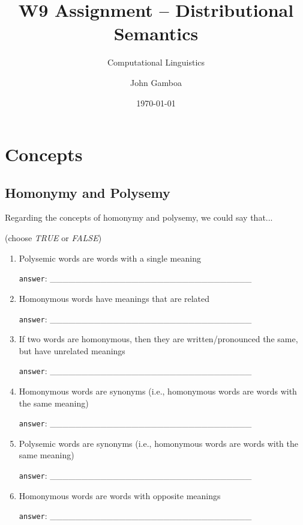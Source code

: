 \documentclass[a4paper,11pt]{scrartcl}
\title{W9 Assignment -- Distributional Semantics}
\subtitle{Computational Linguistics}
\author{John Gamboa}
\date{\today}
\begin{document}
\maketitle


\section{Concepts}

\subsection{Homonymy and Polysemy}

Regarding the concepts of homonymy and polysemy, we could say that...

(choose \textit{TRUE} or \textit{FALSE})

\begin{enumerate}[label=\alph*)]
\singlespacing%

\item Polysemic words are words with a single meaning

\verb|answer|: \_\_\_\_\_\_\_\_\_\_\_\_\_\_\_\_\_\_\_\_\_\_\_\_\_\_\_\_\_\_\_\_

\item Homonymous words have meanings that are related

\verb|answer|: \_\_\_\_\_\_\_\_\_\_\_\_\_\_\_\_\_\_\_\_\_\_\_\_\_\_\_\_\_\_\_\_

\item If two words are homonymous, then they are written/pronounced the same,
      but have unrelated meanings

\verb|answer|: \_\_\_\_\_\_\_\_\_\_\_\_\_\_\_\_\_\_\_\_\_\_\_\_\_\_\_\_\_\_\_\_

\item Homonymous words are synonyms (i.e., homonymous words are words with the
      same meaning)

\verb|answer|: \_\_\_\_\_\_\_\_\_\_\_\_\_\_\_\_\_\_\_\_\_\_\_\_\_\_\_\_\_\_\_\_

\item Polysemic words are synonyms (i.e., homonymous words are words with the
      same meaning)

\verb|answer|: \_\_\_\_\_\_\_\_\_\_\_\_\_\_\_\_\_\_\_\_\_\_\_\_\_\_\_\_\_\_\_\_

\item Homonymous words are words with opposite meanings

\verb|answer|: \_\_\_\_\_\_\_\_\_\_\_\_\_\_\_\_\_\_\_\_\_\_\_\_\_\_\_\_\_\_\_\_


\end{enumerate}
\end{document}
